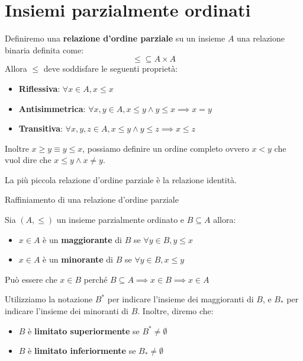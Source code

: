 \section{Insiemi parzialmente ordinati}
\begin{definizione}
    Definiremo una \textbf{relazione d'ordine parziale} su un insieme $A$ una
    relazione binaria definita come:
    \begin{equation}
        \leq \subseteq A \times A
    \end{equation}
    Allora $\leq$ deve soddisfare le seguenti proprietà:
    \begin{itemize}
        \item \textbf{Riflessiva}: $\forall x \in A, x \leq x$
        \item \textbf{Antisimmetrica}: $\forall x, y \in A, x \leq y \land y
                  \leq x \implies x = y$
        \item \textbf{Transitiva}: $\forall x, y, z \in A, x \leq y \land y \leq
                  z \implies x \leq z$
    \end{itemize}
\end{definizione}
Inoltre $x \geq y \equiv y \leq x$, possiamo definire un ordine completo ovvero
$x < y$ che vuol dire che $x \leq y \land x \neq y$.
\begin{osservazione}
    La più piccola relazione d'ordine parziale è la relazione identità.
\end{osservazione}
Raffiniamento di una relazione d'ordine parziale
\begin{definizione}
    Sia $(A,\leq)$ un insieme parzialmente ordinato e $B\subseteq A$ allora:
    \begin{itemize}
        \item $x \in A$ è un \textbf{maggiorante} di $B$ se $\forall y \in B, y \leq x$
        \item $x \in A$ è un \textbf{minorante} di $B$ se $\forall y \in B, x \leq y$
    \end{itemize}
    Può essere che $x\in B$ perché $B\subseteq A\implies x\in B\implies x\in A$
\end{definizione}
Utilizziamo la notazione $B^\ast$ per indicare l'insieme dei maggioranti di $B$,
e $B_\ast$ per indicare l'insieme dei minoranti di $B$. Inoltre, diremo che:
\begin{itemize}
    \item $B$ è \textbf{limitato superiormente} se $B^\ast \neq \emptyset$
    \item $B$ è \textbf{limitato inferiormente} se $B_\ast \neq \emptyset$
\end{itemize}
